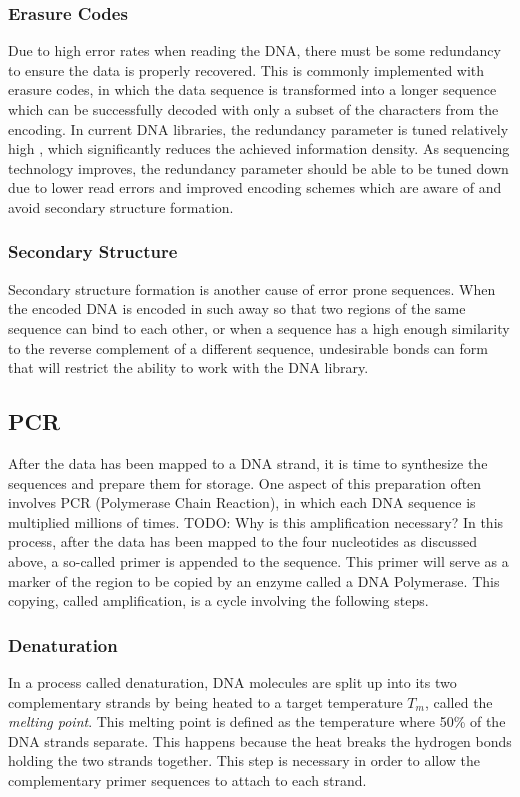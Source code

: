\documentclass[a4paper,conference]{IEEEtran}
\begin{document}
\subsubsection{Erasure Codes}
Due to high error rates when reading the DNA, there must be some redundancy to ensure the data is properly recovered. This is commonly implemented with erasure codes, in which the data sequence is transformed into a longer sequence which can be successfully decoded with only a subset of the characters from the encoding. In current DNA libraries, the redundancy parameter is tuned relatively high \cite{}, which significantly reduces the achieved information density. As sequencing technology improves, the redundancy parameter should be able to be tuned down \cite{} due to lower read errors and improved encoding schemes which are aware of and avoid secondary structure formation.

\subsubsection{Secondary Structure}
Secondary structure formation is another cause of error prone sequences. When the encoded DNA is encoded in such away so that two regions of the same sequence can bind to each other, or when a sequence has a high enough similarity to the reverse complement of a different sequence, undesirable bonds can form that will restrict the ability to work with the DNA library.


\subsection{PCR}
After the data has been mapped to a DNA strand, it is time to synthesize the sequences and prepare them for storage. One aspect of this preparation often involves PCR (Polymerase Chain Reaction), in which each DNA sequence is multiplied millions of times. TODO: Why is this amplification necessary? In this process, after the data has been mapped to the four nucleotides as discussed above, a so-called primer is appended to the sequence. This primer will serve as a marker of the region to be copied by an enzyme called a DNA Polymerase. This copying, called amplification, is a cycle involving the following steps.

\subsubsection{Denaturation}
In a process called denaturation, DNA molecules are split up into its two complementary strands by being heated to a target temperature $T_m$, called the \textit{melting point}. This melting point is defined as the temperature where 50\% of the DNA strands separate. This happens because the heat breaks the hydrogen bonds holding the two strands together. This step is necessary in order to allow the complementary primer sequences to attach to each strand. 
\end{document}
